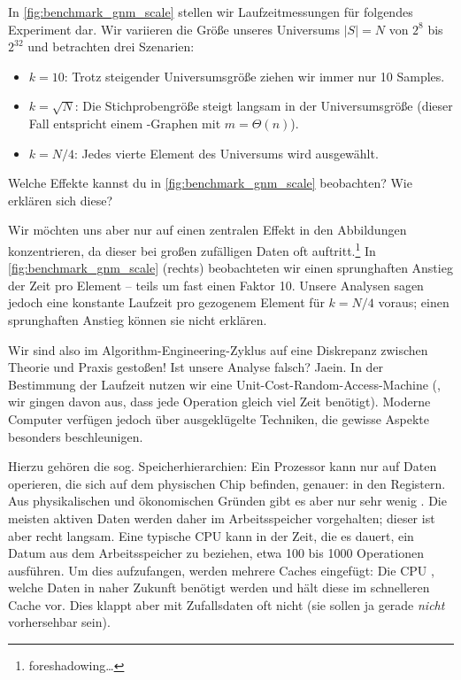 In \cref{fig:benchmark_gnm_scale} stellen wir Laufzeitmessungen für folgendes Experiment dar.
Wir variieren die Größe unseres Universums $|S| = N$ von $2^8$ bis $2^{32}$ und betrachten drei Szenarien:
\begin{itemize}
    \item $k=10$: Trotz steigender Universumsgröße ziehen wir immer nur 10 Samples.
    \item $k=\sqrt{N}$: Die Stichprobengröße steigt langsam in der Universumsgröße (dieser Fall entspricht einem \Gnm-Graphen mit $m = \Theta(n)$).
    \item $k=N/4$: Jedes vierte Element des Universums wird ausgewählt.
\end{itemize}

\begin{exercise}
    Welche Effekte kannst du in \cref{fig:benchmark_gnm_scale} beobachten? Wie erklären sich diese?
\end{exercise}

Wir möchten uns aber nur auf einen zentralen Effekt in den Abbildungen konzentrieren, da dieser bei großen zufälligen Daten oft auftritt.\footnote{foreshadowing\ldots}
In \cref{fig:benchmark_gnm_scale} (rechts) beobachteten wir einen sprunghaften Anstieg der Zeit pro Element -- teils um fast einen Faktor 10.
Unsere Analysen sagen jedoch eine konstante Laufzeit pro gezogenem Element für $k = N/4$ voraus; einen sprunghaften Anstieg können sie nicht erklären.

Wir sind also im Algorithm-Engineering-Zyklus auf eine Diskrepanz zwischen Theorie und Praxis gestoßen!
Ist unsere Analyse falsch? Jaein.
In der Bestimmung der Laufzeit nutzen wir eine Unit-Cost-Random-Access-Machine (\dh, wir gingen davon aus, dass jede Operation gleich viel Zeit benötigt).
Moderne Computer verfügen jedoch über ausgeklügelte Techniken, die gewisse Aspekte besonders beschleunigen.

Hierzu gehören die sog. Speicherhierarchien: Ein Prozessor kann nur auf Daten operieren, die sich auf dem physischen Chip befinden, genauer: in den Registern.
Aus physikalischen und ökonomischen Gründen gibt es aber nur sehr wenig .
Die meisten aktiven Daten werden daher im Arbeitsspeicher vorgehalten; dieser ist aber recht langsam.
Eine typische CPU kann in der Zeit, die es dauert, ein Datum aus dem Arbeitsspeicher zu beziehen, etwa 100 bis 1000 Operationen ausführen.
Um dies aufzufangen, werden mehrere Caches eingefügt: Die CPU , welche Daten in naher Zukunft benötigt werden und hält diese im schnelleren Cache vor.
Dies klappt aber mit Zufallsdaten oft nicht (sie sollen ja gerade \emph{nicht} vorhersehbar sein).

